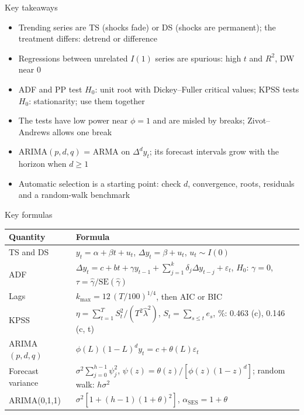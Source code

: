 \begin{frame}{Key takeaways}
\itemsize{\small}
\begin{itemize}
    \item Trending series are TS (shocks fade) or DS (shocks are permanent); the treatment differs: detrend or difference
    \item Regressions between unrelated $I(1)$ series are spurious: high $t$ and $R^2$, DW near 0
    \item ADF and PP test $H_0$: unit root with Dickey--Fuller critical values; KPSS tests $H_0$: stationarity; use them together
    \item The tests have low power near $\phi = 1$ and are misled by breaks; Zivot--Andrews allows one break
    \item ARIMA$(p,d,q)$ = ARMA on $\Delta^d y_t$; its forecast intervals grow with the horizon when $d \ge 1$
    \item Automatic selection is a starting point: check $d$, convergence, roots, residuals and a random-walk benchmark
\end{itemize}
\end{frame}

\begin{frame}{Key formulas}
\itemsize{\small}
{\renewcommand{\arraystretch}{1.4}\begin{center}
\scriptsize
\begin{tabular}{ll}
\toprule
\textbf{Quantity} & \textbf{Formula} \\
\midrule
TS and DS & $y_t = \alpha + \beta t + u_t$, \quad $\Delta y_t = \beta + u_t$, \quad $u_t \sim I(0)$ \\
ADF & $\Delta y_t = c + bt + \gamma y_{t-1} + \sum_{j=1}^{k}\delta_j\Delta y_{t-j} + \varepsilon_t$, \quad $H_0$: $\gamma = 0$, \quad $\tau = \hat\gamma/\mathrm{SE}(\hat\gamma)$ \\
Lags & $k_{\max} = 12\,(T/100)^{1/4}$, then AIC or BIC \\
KPSS & $\eta = \sum_{t=1}^{T} S_t^2/(T^2\hat\lambda^2)$, \quad $S_t = \sum_{s \le t} e_s$, \quad 5\%: 0.463 (c), 0.146 (c, t) \\
ARIMA$(p,d,q)$ & $\phi(L)(1 - L)^d y_t = c + \theta(L)\varepsilon_t$ \\
Forecast variance & $\sigma^2\sum_{j=0}^{h-1}\psi_j^2$, \quad $\psi(z) = \theta(z)/[\phi(z)(1 - z)^d]$; random walk: $h\sigma^2$ \\
ARIMA(0,1,1) & $\sigma^2[1 + (h - 1)(1 + \theta)^2]$, \quad $\alpha_{\mathrm{SES}} = 1 + \theta$ \\
\bottomrule
\end{tabular}
\end{center}
}
\end{frame}

